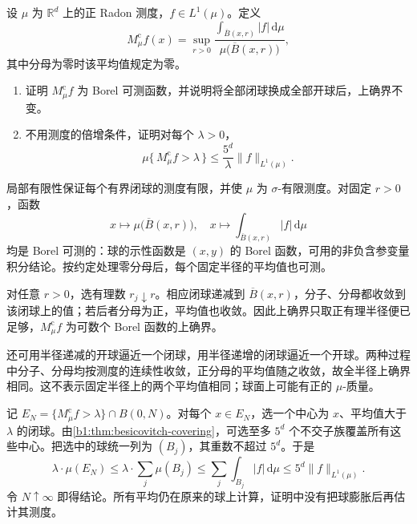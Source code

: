 \begin{optionalexercise}\label{b1:ex:13-radon-centered-maximal}
设 \(\mu\) 为 \(\mathbb R^d\) 上的正 Radon 测度，\(f\in L^1(\mu)\)。定义
\[
 M_\mu^{\mathrm c}f(x)
 =\sup_{r>0}\frac{\displaystyle\int_{\overline B(x,r)}|f|\,\mathrm d\mu}
 {\mu\bigl(\overline B(x,r)\bigr)},
\]
其中分母为零时该平均值规定为零。
\begin{enumerate}
\item\label{b1:item:13-radon-maximal-measurable}
证明 \(M_\mu^{\mathrm c}f\) 为 Borel 可测函数，并说明将全部闭球换成全部开球后，上确界不变。
\item\label{b1:item:13-radon-maximal-weak}
不用测度的倍增条件，证明对每个 \(\lambda>0\)，
\[
 \mu\{\,M_\mu^{\mathrm c}f>\lambda\,\}
 \le\frac{5^d}{\lambda}\|f\|_{L^1(\mu)}.
\]
\end{enumerate}
\end{optionalexercise}
\begin{solution}
局部有限性保证每个有界闭球的测度有限，并使 \(\mu\) 为 \(\sigma\)-有限测度。对固定 \(r>0\)，函数
\[
 x\longmapsto\mu\bigl(\overline B(x,r)\bigr),\quad
 x\longmapsto\int_{\overline B(x,r)}|f|\,\mathrm d\mu
\]
均是 Borel 可测的：球的示性函数是 \((x,y)\) 的 Borel 函数，可用的非负含参变量积分结论。按约定处理零分母后，每个固定半径的平均值也可测。

对任意 \(r>0\)，选有理数 \(r_j\downarrow r\)。相应闭球递减到 \(\overline B(x,r)\)，分子、分母都收敛到该闭球上的值；若后者分母为正，平均值也收敛。因此上确界只取正有理半径便已足够，\(M_\mu^{\mathrm c}f\) 为可数个 Borel 函数的上确界。

还可用半径递减的开球逼近一个闭球，用半径递增的闭球逼近一个开球。两种过程中分子、分母均按测度的连续性收敛，正分母的平均值随之收敛，故全半径上确界相同。这不表示固定半径上的两个平均值相同；球面上可能有正的 \(\mu\)-质量。

记 \(E_N=\{M_\mu^{\mathrm c}f>\lambda\}\cap B(0,N)\)。对每个 \(x\in E_N\)，选一个中心为 \(x\)、平均值大于 \(\lambda\) 的闭球。由\cref{b1:thm:besicovitch-covering}，可选至多 \(5^d\) 个不交子族覆盖所有这些中心。把选中的球统一列为 \((B_j)\)，其重数不超过 \(5^d\)。于是
\[
 \lambda\cdot\mu(E_N)
 \le\lambda\cdot\sum_j\mu(B_j)
 \le\sum_j\int_{B_j}|f|\,\mathrm d\mu
 \le5^d\|f\|_{L^1(\mu)}.
\]
令 \(N\uparrow\infty\) 即得结论。所有平均仍在原来的球上计算，证明中没有把球膨胀后再估计其测度。
\end{solution}

